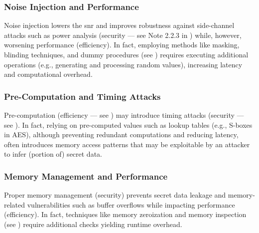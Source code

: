 \subsubsection{Noise Injection and Performance}\label{sec:security_of_cryptographic_algorithms:trade_offs:noise_injection_and_performance}

Noise injection lowers the \gls{snr} and improves robustness against side-channel attacks such as power analysis (security --- see Note 2.2.3 in ) while, however, worsening performance (efficiency). In fact, employing methods like masking, blinding techniques, and dummy procedures (see ) requires executing additional operations (e.g., generating and processing random values), increasing latency and computational overhead.


\subsubsection{Pre-Computation and Timing Attacks}\label{sec:security_of_cryptographic_algorithms:trade_offs:pre_computation_and_timing_attacks}

Pre-computation (efficiency --- see ) may introduce timing attacks (security --- see ). In fact, relying on pre-computed values such as lookup tables (e.g., S-boxes in AES), although preventing redundant computations and reducing latency, often introduces memory access patterns that may be exploitable by an attacker to infer (portion of) secret data.


\subsubsection{Memory Management and Performance}\label{sec:security_of_cryptographic_algorithms:trade_offs:memory_management_and_performance}

Proper memory management (security) prevents secret data leakage and memory-related vulnerabilities such as buffer overflows while impacting performance (efficiency). In fact, techniques like memory zeroization and memory inspection (see ) require additional checks yielding runtime overhead.


